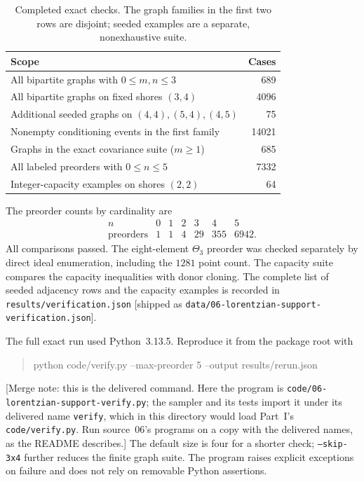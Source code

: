 \documentclass[11pt]{article}
\numberwithin{equation}{section}
\theoremstyle{definition}
\begin{document}
\begin{table}[htbp]
\centering
\caption{Completed exact checks. The graph families in the first two rows
are disjoint; seeded examples are a separate, nonexhaustive suite.}
\begin{tabularx}{\textwidth}{@{}Yr@{}}
\toprule
Scope & Cases\\
\midrule
All bipartite graphs with $0\le m,n\le3$ & 689\\
All bipartite graphs on fixed shores $(3,4)$ & 4096\\
Additional seeded graphs on $(4,4),(5,4),(4,5)$ & 75\\
Nonempty conditioning events in the first family & 14021\\
Graphs in the exact covariance suite ($m\ge1$) & 685\\
All labeled preorders with $0\le n\le5$ & 7332\\
Integer-capacity examples on shores $(2,2)$ & 64\\
\bottomrule
\end{tabularx}
\end{table}

The preorder counts by cardinality are
\[
\begin{array}{c|rrrrrr}
 n&0&1&2&3&4&5\\\hline
 \text{preorders}&1&1&4&29&355&6942.
\end{array}
\]
All comparisons passed. The eight-element $\Theta_3$ preorder was checked
separately by direct ideal enumeration, including the $1281$ point count.
The capacity suite compares the capacity inequalities with donor cloning.
The complete list of seeded adjacency rows and the capacity examples is
recorded in \nolinkurl{results/verification.json} [shipped as
\nolinkurl{data/06-lorentzian-support-verification.json}].

The full exact run used Python~3.13.5. Reproduce it from the package root with
\begin{quote}\small\ttfamily
python code/verify.py --max-preorder 5 --output results/rerun.json
\end{quote}
[Merge note: this is the delivered command. Here the program is
\nolinkurl{code/06-lorentzian-support-verify.py}; the sampler and its tests
import it under its delivered name \texttt{verify}, which in this directory
would load Part~I's \nolinkurl{code/verify.py}. Run source~06's programs on a
copy with the delivered names, as the README describes.]
The default size is four for a shorter check; \texttt{--skip-3x4} further
reduces the finite graph suite. The program raises explicit exceptions on
failure and does not rely on removable Python assertions.
\end{document}

